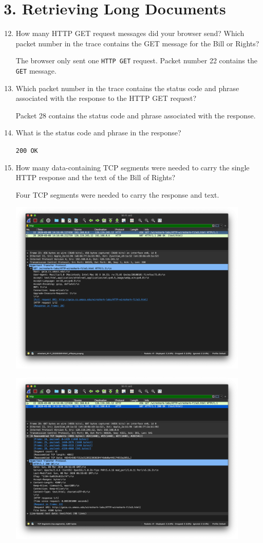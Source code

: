 \documentclass{article}
\begin{document}
\section*{3. Retrieving Long Documents}
\begin{enumerate}
\setcounter{enumi}{11}
\item How many HTTP GET request messages did your browser send? Which packet number in the trace contains the GET message for the Bill or Rights?

\textsf{The browser only sent one \texttt{HTTP GET} request. Packet number 22 contains the \texttt{GET} message.}

\item Which packet number in the trace contains the status code and phrase associated with the response to the HTTP GET request?

\textsf{Packet 28 contains the status code and phrase associated with the response.}

\item What is the status code and phrase in the response?

\texttt{200 OK}

\item How many data-containing TCP segments were needed to carry the single HTTP response and the text of the Bill of Rights?

\textsf{Four TCP segments were needed to carry the response and text.}

\includegraphics[width=0.90\textwidth]{lab2_part3_get}\par
\includegraphics[width=0.90\textwidth]{lab2_part3_response}


\end{enumerate}
\end{document}
